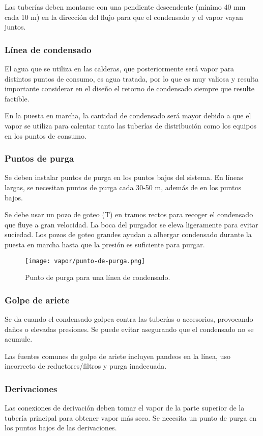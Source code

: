     Las tuberías deben montarse con una pendiente descendente (mínimo 40 mm cada 10 m) en la dirección del flujo para que el condensado y el vapor vayan juntos. 
    


\subsubsection{Línea de condensado}
    El agua que se utiliza en las calderas, que posteriormente será vapor para distintos puntos de consumo, es agua tratada, por lo que es muy valiosa y resulta importante considerar en el diseño el retorno de condensado siempre que resulte factible.
    
    En la puesta en marcha, la cantidad de condensado será mayor debido a que el vapor se utiliza para calentar tanto las tuberías de distribución como los equipos en los puntos de consumo.

\subsubsection{Puntos de purga} Se deben instalar puntos de purga en los puntos bajos del sistema. En líneas largas, se necesitan puntos de purga cada 30-50 m, además de en los puntos bajos.
    
    
    Se debe usar un pozo de goteo (T) en tramos rectos para recoger el condensado que fluye a gran velocidad. La boca del purgador se eleva ligeramente para evitar suciedad. Los pozos de goteo grandes ayudan a albergar condensado durante la puesta en marcha hasta que la presión es suficiente para purgar.
    \begin{figure}[h]
        \centering
        \caption{Punto de purga para una línea de condensado.}
        \texttt{[image: vapor/punto-de-purga.png]}
    \end{figure}

\subsubsection{Golpe de ariete} Se da cuando el condensado golpea contra las tuberías o accesorios, provocando daños o elevadas presiones. Se puede evitar asegurando que el condensado no se acumule. 


Las fuentes comunes de golpe de ariete incluyen pandeos en la línea, uso incorrecto de reductores/filtros y purga inadecuada.
    
    \subsubsection{Derivaciones}
     Las conexiones de derivación deben tomar el vapor de la parte superior de la tubería principal para obtener vapor más seco. Se necesita un punto de purga en los puntos bajos de las derivaciones.

